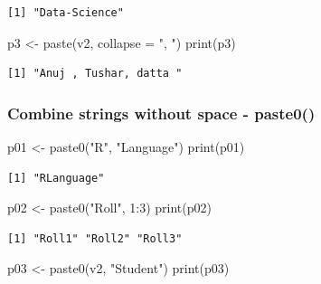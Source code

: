 \documentclass[
  letterpaper,
  DIV=11,
  numbers=noendperiod]{scrartcl}
\newenvironment{Shaded}{\begin{snugshade}}{\end{snugshade}}
\newcommand{\AttributeTok}[1]{\textcolor[rgb]{0.40,0.45,0.13}{#1}}
\newcommand{\DecValTok}[1]{\textcolor[rgb]{0.68,0.00,0.00}{#1}}
\newcommand{\FunctionTok}[1]{\textcolor[rgb]{0.28,0.35,0.67}{#1}}
\newcommand{\NormalTok}[1]{\textcolor[rgb]{0.00,0.23,0.31}{#1}}
\newcommand{\OtherTok}[1]{\textcolor[rgb]{0.00,0.23,0.31}{#1}}
\newcommand{\SpecialCharTok}[1]{\textcolor[rgb]{0.37,0.37,0.37}{#1}}
\newcommand{\StringTok}[1]{\textcolor[rgb]{0.13,0.47,0.30}{#1}}
\begin{document}
\begin{verbatim}
[1] "Data-Science"
\end{verbatim}

\begin{Shaded}
\begin{Highlighting}[]
\NormalTok{p3 }\OtherTok{\textless{}{-}} \FunctionTok{paste}\NormalTok{(v2, }\AttributeTok{collapse =} \StringTok{", "}\NormalTok{)}
\FunctionTok{print}\NormalTok{(p3)}
\end{Highlighting}
\end{Shaded}

\begin{verbatim}
[1] "Anuj , Tushar, datta "
\end{verbatim}

\subsubsection{Combine strings without space -
paste0()}\label{combine-strings-without-space---paste0}

\begin{Shaded}
\begin{Highlighting}[]
\NormalTok{p01 }\OtherTok{\textless{}{-}} \FunctionTok{paste0}\NormalTok{(}\StringTok{"R"}\NormalTok{, }\StringTok{"Language"}\NormalTok{)}
\FunctionTok{print}\NormalTok{(p01)}
\end{Highlighting}
\end{Shaded}

\begin{verbatim}
[1] "RLanguage"
\end{verbatim}

\begin{Shaded}
\begin{Highlighting}[]
\NormalTok{p02 }\OtherTok{\textless{}{-}} \FunctionTok{paste0}\NormalTok{(}\StringTok{"Roll"}\NormalTok{, }\DecValTok{1}\SpecialCharTok{:}\DecValTok{3}\NormalTok{)}
\FunctionTok{print}\NormalTok{(p02)}
\end{Highlighting}
\end{Shaded}

\begin{verbatim}
[1] "Roll1" "Roll2" "Roll3"
\end{verbatim}

\begin{Shaded}
\begin{Highlighting}[]
\NormalTok{p03 }\OtherTok{\textless{}{-}} \FunctionTok{paste0}\NormalTok{(v2, }\StringTok{"Student"}\NormalTok{)}
\FunctionTok{print}\NormalTok{(p03)}
\end{Highlighting}
\end{Shaded}
\end{document}
